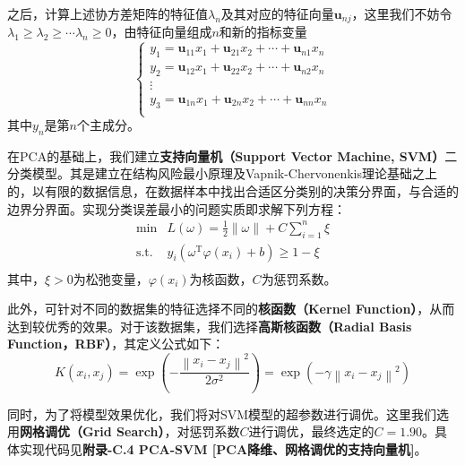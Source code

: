\documentclass{MathorCupmodeling}
\begin{document}
	之后，计算上述协方差矩阵的特征值$\lambda_n$及其对应的特征向量$\boldsymbol{u}_{nj}$，这里我们不妨令$\lambda_1\geqslant\lambda_2\geqslant\cdots\lambda_n\geqslant 0$，由特征向量组成$n$和新的指标变量
	\begin{equation}
		\left\{ \begin{array}{l}
			y_1=\boldsymbol{u}_{11}x_1+\boldsymbol{u}_{21}x_2+\cdots +\boldsymbol{u}_{n1}x_n\\
			y_2=\boldsymbol{u}_{12}x_1+\boldsymbol{u}_{22}x_2+\cdots +\boldsymbol{u}_{n2}x_n\\
			\vdots\\
			y_3=\boldsymbol{u}_{1n}x_1+\boldsymbol{u}_{2n}x_2+\cdots +\boldsymbol{u}_{nn}x_n\\
		\end{array} \right. 
	\end{equation}
	其中$y_n$是第$n$个主成分。

	在PCA的基础上，我们建立\textbf{支持向量机（Support Vector Machine, SVM）}二分类模型。其是建立在结构风险最小原理及Vapnik-Chervonenkis理论基础之上的\textcolor{blue}{\cite{汪海燕}}，以有限的数据信息，在数据样本中找出合适区分类别的决策分界面，与合适的边界分界面。实现分类误差最小的问题实质即求解下列方程\textcolor{blue}{\cite{张松兰}}：
	\begin{equation}
		\begin{array}{cl}
			\min & L\left( \omega \right) =\frac{1}{2}\lVert \omega \rVert +C\sum\limits_{i=1}^n{\xi}\\
			\text{s.t.\ } & y_i\left( \omega ^{\text{T}}\varphi \left( x_i \right) +b \right) \geqslant 1-\xi\\
		\end{array}
	\end{equation}
	其中，$\xi>0$为松弛变量，$\varphi\left(x_i\right)$为核函数，$C$为惩罚系数。

	此外，可针对不同的数据集的特征选择不同的\textbf{核函数（Kernel Function）}，从而达到较优秀的效果。对于该数据集，我们选择\textbf{高斯核函数（Radial Basis Function，RBF）}，其定义公式如下：
	\begin{equation}
		K\left(x_i, x_j\right)=\exp \left(-\frac{\left\|x_i-x_j\right\|^{2}}{2\sigma^{2}}\right)=\exp \left(-\gamma \left\|x_i-x_j\right\|^{2}\right)
	\end{equation}
	
	同时，为了将模型效果优化，我们将对SVM模型的超参数进行调优。这里我们选用\textbf{网格调优（Grid Search）}，对惩罚系数$C$进行调优，最终选定的$C=1.90$。具体实现代码见\textbf{附录-C.4  PCA-SVM [PCA降维、网格调优的支持向量机]}。
\end{document}
